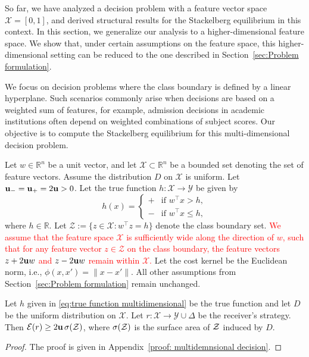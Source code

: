 So far, we have analyzed a decision problem with a feature vector space $\mathcal{X} = [0,1]$, and derived structural results for the Stackelberg equilibrium in this context. In this section, we generalize our analysis to a higher-dimensional feature space. We show that, under certain assumptions on the feature space, this higher-dimensional setting can be reduced to the one described in Section~\ref{sec:Problem formulation}.

We focus on decision problems where the class boundary is defined by a linear hyperplane. Such scenarios commonly arise when decisions are based on a weighted sum of features, for example, admission decisions in academic institutions often depend on weighted combinations of subject scores. Our objective is to compute the Stackelberg equilibrium for this multi-dimensional decision problem.

Let $w \in \mathbb{R}^n$ be a unit vector, and let $\mathcal{X} \subset \mathbb{R}^n$ be a bounded set denoting the set of feature vectors. Assume the distribution $D$ on $\mathcal{X}$ is uniform. Let $\mathbf{u_-} = \mathbf{u_+} = 2\mathbf{u} > 0$. Let the true function $h: \mathcal{X} \to \mathcal{Y}$ be given by
\begin{equation}\label{eq:true function multidimensional}
    h(x) = \begin{cases}
        \plus & \text{if } w^\top x > h, \\
        \minus & \text{if } w^\top x \leq h,
    \end{cases}
\end{equation}
where $h \in \mathbb{R}$.
Let $\mathcal{Z} := \{z \in \mathcal{X} : w^\top z = h\}$ denote the class boundary set.  \textcolor{red}{We assume that the feature space $\mathcal{X}$ is sufficiently wide along the direction of $w$, such that for any feature vector $z \in \mathcal{Z}$ on the class boundary, the feature vectors $z + 2\mathbf{u} w$ and $z - 2\mathbf{u} w$ remain within $\mathcal{X}$.}
Let the cost kernel be the Euclidean norm, i.e., $\phi(x, x') = \|x - x'\|$. All other assumptions from Section~\ref{sec:Problem formulation} remain unchanged.

\begin{thm}\label{thm: multidimension decision problem}
    Let $h$ given in \eqref{eq:true function multidimensional} be the true function and let $D$ be the uniform distribution on $\mathcal{X}$. Let
    $r: \mathcal{X} \rightarrow \mathcal{Y} \cup \Delta$ be the receiver's strategy. Then $\mathcal{E}(r) \geq 2\mathbf{u}\,\sigma(\mathcal{Z})$, where $\sigma(\mathcal{Z})$ is the surface area of $\mathcal{Z}$ induced by $D$.
\end{thm}
\begin{proof}
    The proof is given in Appendix~\ref{proof: multidemnsional decision}.
\end{proof}

